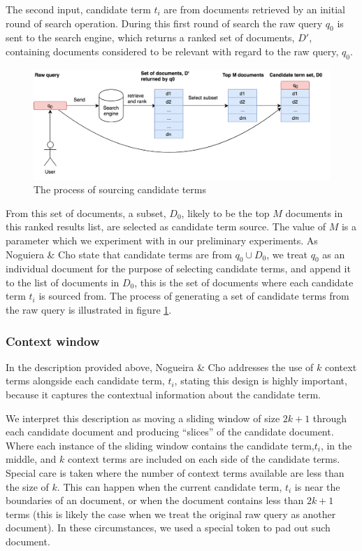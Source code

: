 The second input, candidate term $t_i$  are from documents retrieved by an initial round of search operation. During this first round of search the raw query $q_0$ is sent to the search engine, which returns a ranked set of documents, $D'$, containing documents considered to be relevant with regard to the raw query, $q_0$. 
\begin{figure}
	\centering
	\includegraphics[width=1\textwidth]{images/chapter_4/Chapter_4-source_of_candidate_terms.png}
	\caption{The process of sourcing candidate terms}
	\label{fig:cand_source}
\end{figure}
From this set of documents, a subset, $D_0$, likely to be the top $M$ documents in this ranked results list, are selected as candidate term source. The value of $M$ is a parameter which we experiment with in our preliminary experiments. As Noguiera \& Cho state that candidate terms are from $q_0 \cup D_0$, we treat $q_0$ as an individual document for the purpose of selecting candidate terms, and append it to the list of documents in $D_0$, this is the set of documents where each candidate term $t_i$  is sourced from.  The process of generating a set of candidate terms from the raw query is illustrated in figure \ref{fig:cand_source}.



\subsubsection{Context window}

In the description provided above, Nogueira \& Cho\cite{nogueira2017task} addresses the use of $k$ context terms alongside each candidate term, $t_i$, stating this design is highly important, because it captures the contextual information about the candidate term. 

We interpret this description as moving a sliding window of size $2k + 1$ through each candidate document and producing ``slices'' of the candidate document. Where each instance of the sliding window contains the candidate term,$t_i$, in the middle, and $k$ context terms are included on each side of the candidate terms. Special care is taken where the number of context terms available are less than the size of $k$. This can happen when the current candidate term, $t_i$ is near the boundaries of an document, or when the document contains less than $2k + 1$ terms (this is likely the case when we treat the original raw query as another document). In these circumstances, we used a special token to pad out such document. 

